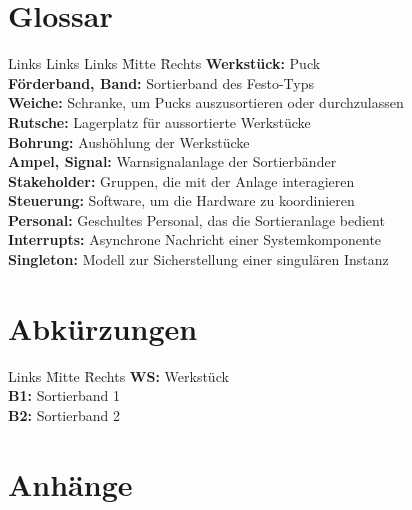 \documentclass[oneside,a4paper,titlepage]{scrartcl}              %
\begin{document}
\newpage

\section{Glossar}
\begin{tabbing}
  Links Links Links \= Mitte \= Rechts \kill
  \textbf{Werkstück:} \> \>        Puck\\
  \textbf{Förderband, Band:} \> \> Sortierband des Festo-Typs\\
  \textbf{Weiche:}           \> \> Schranke, um Pucks auszusortieren oder durchzulassen\\
  \textbf{Rutsche:}          \> \> Lagerplatz für aussortierte Werkstücke\\
  \textbf{Bohrung:}          \> \> Aushöhlung der Werkstücke\\
  \textbf{Ampel, Signal:}    \> \> Warnsignalanlage der Sortierbänder\\
  \textbf{Stakeholder:}      \> \> Gruppen, die mit der Anlage interagieren\\
  \textbf{Steuerung:}        \> \> Software, um die Hardware zu koordinieren\\
  \textbf{Personal:}         \> \> Geschultes Personal, das die Sortieranlage bedient\\
  \textbf{Interrupts:}       \> \> Asynchrone Nachricht einer Systemkomponente\\
  \textbf{Singleton:}        \> \> Modell zur Sicherstellung einer singulären Instanz\\
\end{tabbing}


\section{Abkürzungen}
\begin{tabbing}
  Links \= Mitte \= Rechts \kill
  \textbf{WS:} \> \> Werkstück\\
  \textbf{B1:} \> \> Sortierband 1\\
  \textbf{B2:} \> \> Sortierband 2\\
\end{tabbing}

\newpage

\section{Anhänge}

\end{document}
